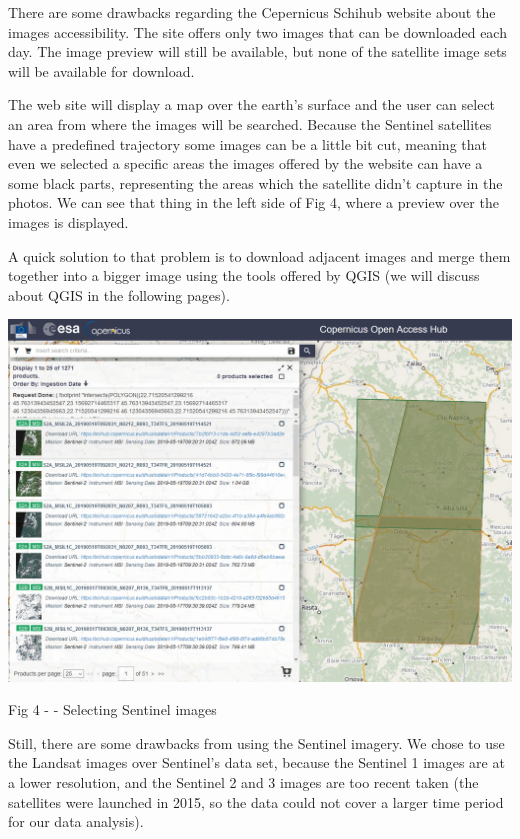 \documentclass[12pt, a4paper]{report}
\begin{document}
There are some drawbacks regarding the Cepernicus Schihub website about the images accessibility. The site offers only two images that can be downloaded each day. The image preview will still be available, but none of the satellite image sets will be available for download. 
\par 

The web site will display a map over the earth's surface and the user can select an area from where the images will be searched. Because the Sentinel satellites have a predefined trajectory some images can be a little bit cut, meaning that even we selected a specific areas the images offered by the website can have a some black parts, representing the areas which the satellite didn't capture in the photos. We can see that thing in the left side of Fig 4, where a preview over the images is displayed.
\par 

A quick solution to that problem is to download adjacent images and merge them together into a bigger image using the tools offered by QGIS (we will discuss about QGIS in the following pages).

\newpage
\bigskip

\includegraphics[scale=0.54, center]{sentinel.png} 
\begin{center}
Fig 4 - \cite{Copernicus} - Selecting Sentinel images
\end{center}
\par 


Still, there are some drawbacks from using the Sentinel imagery. We chose to use the Landsat images over Sentinel's data set, because the Sentinel 1 images are at a lower resolution, and the Sentinel 2 and 3 images are too recent taken (the satellites were launched in 2015, so the data could not cover a larger time period for our data analysis).
\par 
\end{document}
